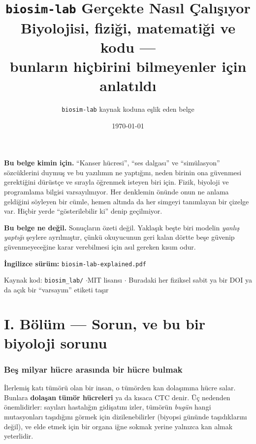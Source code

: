 \documentclass[11pt,a4paper]{article}
\title{\vspace{-1.2cm}\sffamily\bfseries
  \texttt{biosim-lab} Gerçekte Nasıl Çalışıyor\\[4pt]
  \large\mdseries Biyolojisi, fiziği, matematiği ve kodu ---\\
  \large\mdseries bunların hiçbirini bilmeyenler için anlatıldı}
\author{\sffamily\normalsize \texttt{biosim-lab} kaynak koduna eşlik eden belge}
\date{\sffamily\small\today}
\begin{document}
\maketitle
\thispagestyle{empty}

\begin{center}
\begin{minipage}{0.86\textwidth}
\small\color{muted}
\textbf{Bu belge kimin için.} ``Kanser hücresi'', ``ses dalgası'' ve
``simülasyon'' sözcüklerini duymuş ve bu yazılımın ne yaptığını, neden birinin
ona güvenmesi gerektiğini dürüstçe ve sırayla öğrenmek isteyen biri için.
Fizik, biyoloji ve programlama bilgisi varsayılmıyor. Her denklemin önünde onun
ne anlama geldiğini söyleyen bir cümle, hemen altında da her simgeyi tanımlayan
bir çizelge var. Hiçbir yerde ``gösterilebilir ki'' denip geçilmiyor.

\medskip
\textbf{Bu belge ne değil.} Sonuçların özeti değil. Yaklaşık beşte biri modelin
\emph{yanlış yaptığı} şeylere ayrılmıştır, çünkü okuyucunun geri kalan dörtte
beşe güvenip güvenmeyeceğine karar verebilmesi için asıl gereken kısım odur.

\medskip
\textbf{İngilizce sürüm:} \texttt{biosim-lab-explained.pdf}
\end{minipage}
\end{center}

\vfill
\begin{center}
\small\color{muted}
Kaynak kod: \texttt{biosim\_lab/} \quad$\cdot$\quad MIT lisansı \quad$\cdot$\quad
Buradaki her fiziksel sabit ya bir DOI ya da açık bir ``varsayım'' etiketi taşır
\end{center}
\clearpage

\tableofcontents
\clearpage

\part*{I. Bölüm --- Sorun, ve bu bir biyoloji sorunu}
\section{Beş milyar hücre arasında bir hücre bulmak}

İlerlemiş katı tümörü olan bir insan, o tümörden kan dolaşımına hücre salar.
Bunlara \textbf{dolaşan tümör hücreleri} ya da kısaca CTC denir. Üç nedenden
önemlidirler: sayıları hastalığın gidişatını izler, tümörün \emph{bugün} hangi
mutasyonları taşıdığını görmek için dizilenebilirler (biyopsi gününde
taşıdıklarını değil), ve elde etmek için bir organa iğne sokmak yerine yalnızca
kan almak yeterlidir.
\end{document}
